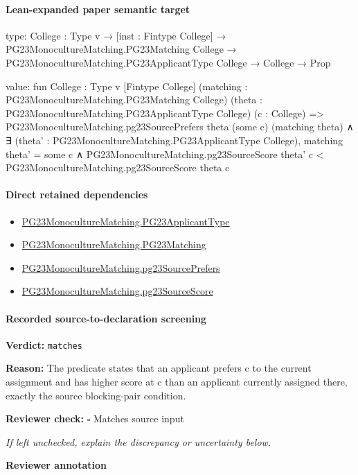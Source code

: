 \documentclass[10pt]{article}
\newcommand{\reviewerbox}{%
  \par\noindent\fbox{\parbox{0.96\linewidth}{\rule{0pt}{0.38in}}}\par
}
\newcommand{\reviewmatch}[1]{%
  \par\noindent\textbf{Reviewer check:} $\square$\; #1\par
  \noindent\emph{If left unchecked, explain the discrepancy or uncertainty below.}\par
}
\begin{document}
\paragraph{Lean-expanded paper semantic target}
\begin{ReviewVerbatim}
type:
{College : Type v} →
  [inst : Fintype College] →
    PG23MonocultureMatching.PG23Matching College → PG23MonocultureMatching.PG23ApplicantType College → College → Prop

value:
fun {College : Type v} [Fintype College] (matching : PG23MonocultureMatching.PG23Matching College)
    (theta : PG23MonocultureMatching.PG23ApplicantType College) (c : College) =>
  PG23MonocultureMatching.pg23SourcePrefers theta (some c) (matching theta) ∧
    ∃ (theta' : PG23MonocultureMatching.PG23ApplicantType College),
      matching theta' = some c ∧
        PG23MonocultureMatching.pg23SourceScore theta' c < PG23MonocultureMatching.pg23SourceScore theta c
\end{ReviewVerbatim}

\paragraph{Direct retained dependencies}
\begin{itemize}\raggedright
\item \hyperlink{paper-prerequisite-40ad59c353cf95ec}{PG23\allowbreak{}Monoculture\allowbreak{}Matching.\allowbreak{}PG23\allowbreak{}Applicant\allowbreak{}Type}
\item \hyperlink{paper-prerequisite-6458c12e2da75e1b}{PG23\allowbreak{}Monoculture\allowbreak{}Matching.\allowbreak{}PG23\allowbreak{}Matching}
\item \hyperlink{governing-declaration-a79bb975b740cd0d}{PG23\allowbreak{}Monoculture\allowbreak{}Matching.\allowbreak{}pg23\allowbreak{}Source\allowbreak{}Prefers}
\item \hyperlink{paper-prerequisite-9b09ee190ab81202}{PG23\allowbreak{}Monoculture\allowbreak{}Matching.\allowbreak{}pg23\allowbreak{}Source\allowbreak{}Score}
\end{itemize}
\paragraph{Recorded source-to-declaration screening}
\textbf{Verdict:} \texttt{matches}
\\
{\raggedright
\textbf{Reason:} The predicate states that an applicant prefers c to the current assignment and has higher score at c than an applicant currently assigned there, exactly the source blocking-\allowbreak{}pair condition.\allowbreak{}
\par}
\reviewmatch{Matches source input}
\noindent\textbf{Reviewer annotation}\par
\reviewerbox
\clearpage
\hypertarget{paper-prerequisite-500c3d3f4de9e8d5}{}
\end{document}
